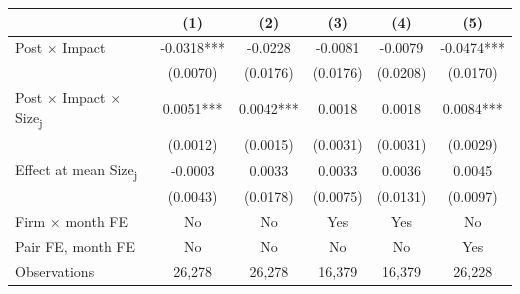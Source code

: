 \begin{tabular}{lccccc}
\toprule
 & (1) & (2) & (3) & (4) & (5) \\
\midrule
Post \(\times\) Impact & -0.0318*** & -0.0228 & -0.0081 & -0.0079 & -0.0474*** \\
 & (0.0070) & (0.0176) & (0.0176) & (0.0208) & (0.0170) \\
Post \(\times\) Impact \(\times\) Size\textsubscript{j} &  0.0051*** &  0.0042*** &  0.0018 &  0.0018 &  0.0084*** \\
 & (0.0012) & (0.0015) & (0.0031) & (0.0031) & (0.0029) \\
Effect at mean Size\textsubscript{j} & -0.0003 &  0.0033 &  0.0033 &  0.0036 &  0.0045 \\
 & (0.0043) & (0.0178) & (0.0075) & (0.0131) & (0.0097) \\
\midrule
Firm \(\times\) month FE & No & No & Yes & Yes & No \\
Pair FE, month FE & No & No & No & No & Yes \\
Observations &    26,278 &    26,278 &    16,379 &    16,379 &    26,228 \\
\bottomrule
\end{tabular}
